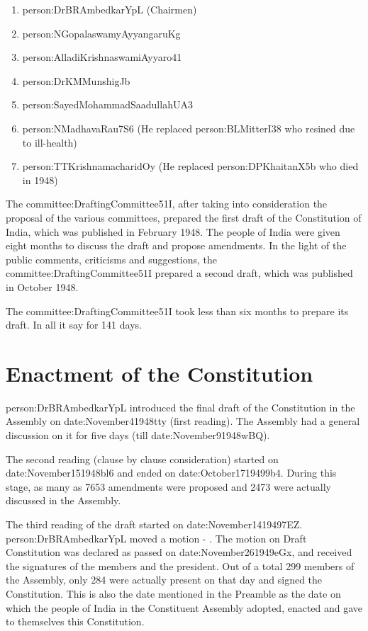 \begin{enumerate}
  \item \gls{person:DrBRAmbedkarYpL} ({ Chairmen})
  \item \gls{person:NGopalaswamyAyyangaruKg}
  \item \gls{person:AlladiKrishnaswamiAyyaro41}
  \item \gls{person:DrKMMunshigJb}
  \item \gls{person:SayedMohammadSaadullahUA3}
  \item \gls{person:NMadhavaRau7S6} (He replaced \gls{person:BLMitterI38} who resined due to ill-health)
  \item \gls{person:TTKrishnamacharidOy} (He replaced \gls{person:DPKhaitanX5b} who died in 1948)
\end{enumerate}

The \gls{committee:DraftingCommittee51I}, after taking into consideration the proposal of the various committees, prepared the first draft of the Constitution of India, which was published in February 1948. The people of India were given eight months to discuss the draft and propose amendments. In the light of the public comments, criticisms and suggestions, the \gls{committee:DraftingCommittee51I} prepared a second draft, which was published in October 1948.

The \gls{committee:DraftingCommittee51I} took less than six months to prepare its draft. In all it say for 141 days.

\section{Enactment of the Constitution}

\gls{person:DrBRAmbedkarYpL} introduced the final draft of the Constitution in the Assembly on \gls{date:November41948tty} (first reading). The Assembly had a general discussion on it for five days (till \gls{date:November91948wBQ}).

The second reading (clause by clause consideration) started on \gls{date:November151948bl6} and ended on \gls{date:October1719499b4}. During this stage, as many as 7653 amendments were proposed and 2473 were actually discussed in the Assembly.

The third reading of the draft started on \gls{date:November1419497EZ}. \gls{person:DrBRAmbedkarYpL} moved a motion - . The motion on Draft Constitution was declared as passed on \gls{date:November261949eGx}, and received the signatures of the members and the president. Out of a total 299 members of the Assembly, only 284 were actually present on that day and signed the Constitution. This is also the date mentioned in the Preamble as the date on which the people of India in the Constituent Assembly adopted, enacted and gave to themselves this Constitution.

